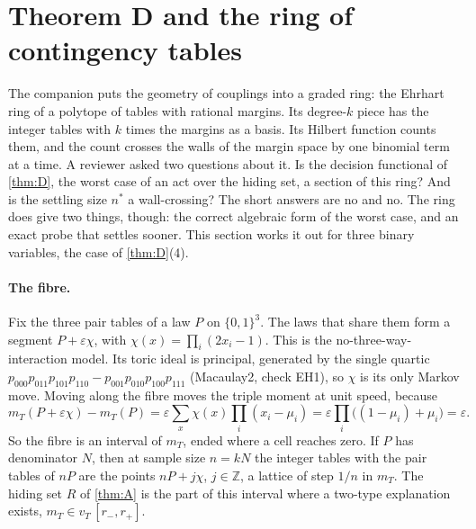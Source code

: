 \section{Theorem D and the ring of contingency tables}\label{sec:ehrhart}
The companion \cite{CouplingAlgebras} puts the geometry of couplings into a graded ring: the Ehrhart ring of a polytope of tables with
rational margins. Its degree-$k$ piece has the integer tables with $k$ times the margins as a basis. Its Hilbert function counts them,
and the count crosses the walls of the margin space by one binomial term at a time. A reviewer asked two questions about it. Is the
decision functional of \cref{thm:D}, the worst case of an act over the hiding set, a section of this ring? And is the settling size
$n^*$ a wall-crossing? The short answers are no and no. The ring does give two things, though: the correct algebraic form of the worst
case, and an exact probe that settles sooner. This section works it out for three binary variables, the case of \cref{thm:D}(4).

\paragraph{The fibre.} Fix the three pair tables of a law $P$ on $\{0,1\}^3$. The laws that share them form a segment
$P+\varepsilon\chi$, with $\chi(x)=\prod_i(2x_i-1)$. This is the no-three-way-interaction model. Its toric ideal is principal, generated by
the single quartic $p_{000}p_{011}p_{101}p_{110}-p_{001}p_{010}p_{100}p_{111}$ (Macaulay2, check EH1), so $\chi$ is its only Markov
move. Moving along the fibre moves the triple moment at unit speed, because
\[
m_T(P+\varepsilon\chi)-m_T(P)=\varepsilon\sum_x\chi(x)\prod_i(x_i-\mu_i)=\varepsilon\prod_i\bigl((1-\mu_i)+\mu_i\bigr)=\varepsilon .
\]
So the fibre is an interval of $m_T$, ended where a cell reaches zero. If $P$ has denominator $N$, then at sample size $n=kN$ the integer
tables with the pair tables of $nP$ are the points $nP+j\chi$, $j\in\mathbb Z$, a lattice of step $1/n$ in $m_T$. The hiding set $R$
of \cref{thm:A} is the part of this interval where a two-type explanation exists, $m_T\in v_T\,[r_-,r_+]$.

